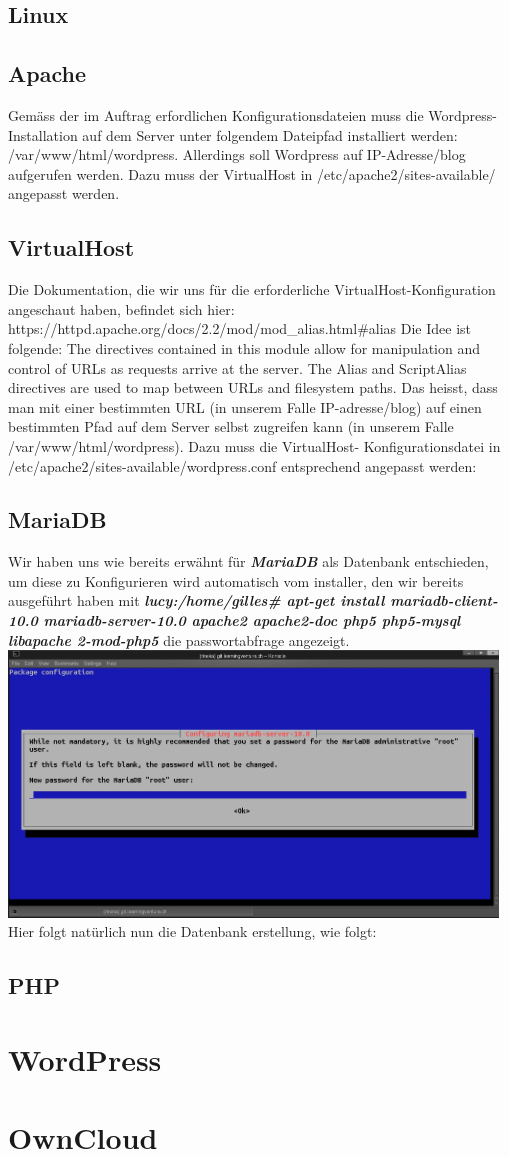 \documentclass{article}
\begin{document}
	\subsection{Linux}
	\subsection{Apache}
	Gemäss der im Auftrag erfordlichen Konfigurationsdateien muss die Wordpress-Installation auf dem Server unter folgendem Dateipfad installiert werden: /var/www/html/wordpress.
	Allerdings soll Wordpress auf IP-Adresse/blog aufgerufen werden. Dazu muss der VirtualHost in /etc/apache2/sites-available/ angepasst werden.
	\subsection{VirtualHost}
	Die Dokumentation, die wir uns für die erforderliche VirtualHost-Konfiguration angeschaut haben, befindet sich hier: https://httpd.apache.org/docs/2.2/mod/mod_alias.html\#alias
	Die Idee ist folgende:
	The directives contained in this module allow for manipulation and control of URLs as requests arrive at the server. The Alias and ScriptAlias directives are used to map between URLs and filesystem paths.
	Das heisst, dass man mit einer bestimmten URL (in unserem Falle IP-adresse/blog) auf einen bestimmten Pfad auf dem Server selbst zugreifen kann (in unserem Falle /var/www/html/wordpress). Dazu muss die VirtualHost- Konfigurationsdatei in /etc/apache2/sites-available/wordpress.conf entsprechend angepasst werden:
	\subsection{MariaDB}
	Wir haben uns wie bereits erwähnt für \textit{\textbf{MariaDB}}  als Datenbank entschieden, um diese zu Konfigurieren wird automatisch vom installer, den wir bereits ausgeführt haben mit \textit{\textbf{lucy:/home/gilles\# apt-get install mariadb-client-10.0 mariadb-server-10.0 apache2 apache2-doc php5 php5-mysql libapache 2-mod-php5}} die passwortabfrage angezeigt.
	\newline
	\newline
	\includegraphics[width=13cm]{../Pics/3-lamp-stack-mariadb}
	\newline
	\newline
	Hier folgt natürlich nun die Datenbank erstellung, wie folgt:
	\subsection{PHP}
	\section{WordPress}
	\section{OwnCloud}
\end{document}
